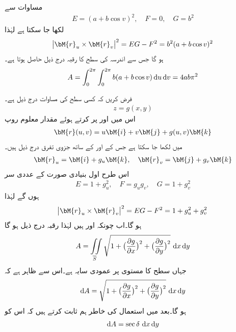 مساوات  سے
\begin{align*}
E=(a+b\cos v)^2,\quad F=0,\quad G=b^2
\end{align*}
لکھا جا سکتا ہے لہٰذا
\begin{align*}
\abs{\bM{r}_u\times \bM{r}_v}^2=EG-F^2=b^2(a+b\cos v)^2
\end{align*}
ہو گا جس سے اندرسہ کی سطح کا رقبہ درج ذیل حاصل ہوتا ہے۔
\begin{align*}
A=\int_{0}^{2\pi}\int_0^{2\pi}b(a+b\cos v)\dif u\dif v=4ab\pi^2
\end{align*}

فرض کریں کہ کسی سطح کی مساوات درج ذیل ہے۔
\begin{align}
z=g(x,y)
\end{align}
اس میں  اور  پر کرتے ہوئے مقدار معلوم روپ
\begin{align}
\bM{r}(u,v)=u\bM{i}+v\bM{j}+g(u,v)\bM{k}
\end{align}
میں لکھا جا سکتا ہے جس کے  اور  کے ساتھ جزوی تفرق درج ذیل ہیں۔
\begin{align}\label{مساوات_خطی_تکمل_جزوی_تفرقات_الف}
\bM{r}_u=\bM{i}+g_u\bM{k},\quad \bM{r}_v=\bM{j}+g_v\bM{k}
\end{align}
اس طرح اول بنیادی صورت کے عددی سر
\begin{align*}
E=1+g_u^2,\quad F=g_ug_v,\quad G=1+g_v^2
\end{align*}
ہوں گے لہٰذا
\begin{align*}
\abs{\bM{r}_u\times \bM{r}_v}^2=EG-F^2=1+g_u^2+g_v^2
\end{align*}
ہو گا۔اب چونکہ  اور  ہیں  لہٰذا رقبہ درج ذیل ہو گا
\begin{align}\label{مساوات_خطی_تکمل_صریح_تفاعل_رقبہ_الف}
A=\iint\limits_{\overline{S}} \sqrt{1+\big(\frac{\partial g}{\partial x}\big)^2+\big(\frac{\partial g}{\partial y}\big)^2}\,\dif x\dif y
\end{align}
جہاں سطح  کا  مستوی پر عمودی سایہ  ہے۔اس سے ظاہر ہے کہ
\begin{align}\label{مساوات_خطی_تکمل_صریح_تفاعل_رقبہ_ب}
\dif A=\sqrt{1+\big(\frac{\partial g}{\partial x}\big)^2+\big(\frac{\partial g}{\partial y}\big)^2}\,\dif x\dif y
\end{align}
ہو گا۔بعد میں استعمال کی خاطر ہم ثابت کرتے ہیں کہ اس کو
\begin{align}\label{مساوات_خطی_تکمل_صریح_تفاعل_رقبہ_پ}
\dif A=\sec \delta \, \dif x\dif y
\end{align}
